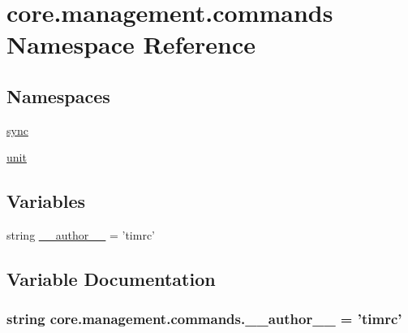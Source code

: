 \hypertarget{namespacecore_1_1management_1_1commands}{\section{core.\-management.\-commands Namespace Reference}
\label{namespacecore_1_1management_1_1commands}
}
\subsection*{Namespaces}
\begin{DoxyCompactItemize}
\item 
\hyperlink{namespacecore_1_1management_1_1commands_1_1sync}{sync}
\item 
\hyperlink{namespacecore_1_1management_1_1commands_1_1unit}{unit}
\end{DoxyCompactItemize}
\subsection*{Variables}
\begin{DoxyCompactItemize}
\item 
string \hyperlink{namespacecore_1_1management_1_1commands_ac1c6651c8c0dfcb25f81696c4889951a}{\-\_\-\-\_\-author\-\_\-\-\_\-} = 'timrc'
\end{DoxyCompactItemize}


\subsection{Variable Documentation}
\hypertarget{namespacecore_1_1management_1_1commands_ac1c6651c8c0dfcb25f81696c4889951a}{
\subsubsection[{\-\_\-\-\_\-author\-\_\-\-\_\-}]{\setlength{\rightskip}{0pt plus 5cm}string core.\-management.\-commands.\-\_\-\-\_\-author\-\_\-\-\_\- = 'timrc'}}\label{namespacecore_1_1management_1_1commands_ac1c6651c8c0dfcb25f81696c4889951a}

